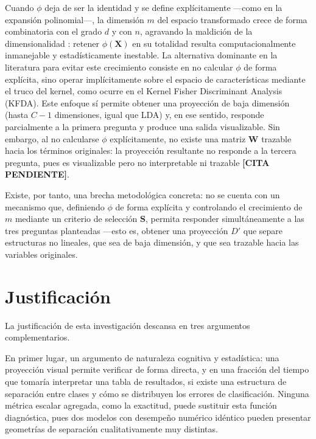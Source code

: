 	Cuando $\phi$ deja de ser la identidad y se define explícitamente —como en la expansión polinomial—, la dimensión $m$ del espacio transformado crece de forma combinatoria con el grado $d$ y con $n$, agravando la maldición de la dimensionalidad \cite{bishop2006pattern}\cite{asaduzzaman2024dimensionality}: retener $\phi(\mathbf{X})$ en su totalidad resulta computacionalmente inmanejable y estadísticamente inestable. La alternativa dominante en la literatura para evitar este crecimiento consiste en no calcular $\phi$ de forma explícita, sino operar implícitamente sobre el espacio de características mediante el truco del kernel, como ocurre en el Kernel Fisher Discriminant Analysis (KFDA). Este enfoque sí permite obtener una proyección de baja dimensión (hasta $C-1$ dimensiones, igual que LDA) y, en ese sentido, responde parcialmente a la primera pregunta y produce una salida visualizable. Sin embargo, al no calcularse $\phi$ explícitamente, no existe una matriz $\mathbf{W}$ trazable hacia los términos originales: la proyección resultante no responde a la tercera pregunta, pues es visualizable pero no interpretable ni trazable \textbf{[CITA PENDIENTE]}.
	
	Existe, por tanto, una brecha metodológica concreta: no se cuenta con un mecanismo que, definiendo $\phi$ de forma explícita y controlando el crecimiento de $m$ mediante un criterio de selección $\mathbf{S}$, permita responder simultáneamente a las tres preguntas planteadas —esto es, obtener una proyección $D'$ que separe estructuras no lineales, que sea de baja dimensión, y que sea trazable hacia las variables originales.
	
	\section{Justificación}
	\label{sec:Justificación}
	
	La justificación de esta investigación descansa en tres argumentos complementarios.
	
	En primer lugar, un argumento de naturaleza cognitiva y estadística: una proyección visual permite verificar de forma directa, y en una fracción del tiempo que tomaría interpretar una tabla de resultados, si existe una estructura de separación entre clases y cómo se distribuyen los errores de clasificación. Ninguna métrica escalar agregada, como la exactitud, puede sustituir esta función diagnóstica, pues dos modelos con desempeño numérico idéntico pueden presentar geometrías de separación cualitativamente muy distintas.
	
